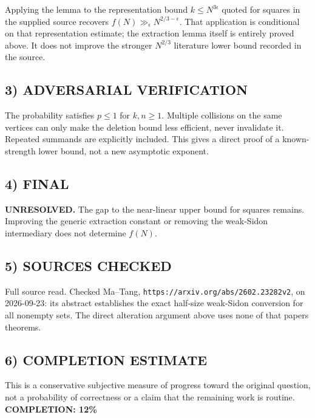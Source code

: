 Applying the lemma to the representation bound $k\le N^{3\epsilon}$ quoted for squares in the supplied source recovers $f(N)\gg_\epsilon N^{2/3-\epsilon}$. That application is conditional on that representation estimate; the extraction lemma itself is entirely proved above. It does not improve the stronger $N^{2/3}$ literature lower bound recorded in the source.
\subsection{3) ADVERSARIAL VERIFICATION}
The probability satisfies $p\le1$ for $k,n\ge1$. Multiple collisions on the same vertices can only make the deletion bound less efficient, never invalidate it. Repeated summands are explicitly included. This gives a direct proof of a known-strength lower bound, not a new asymptotic exponent.
\subsection{4) FINAL}
\textbf{UNRESOLVED.}
The gap to the near-linear upper bound for squares remains. Improving the generic extraction constant or removing the weak-Sidon intermediary does not determine $f(N)$.
\subsection{5) SOURCES CHECKED}
Full source read. Checked Ma--Tang, \texttt{https://arxiv.org/abs/2602.23282v2}, on 2026-09-23: its abstract establishes the exact half-size weak-Sidon conversion for all nonempty sets. The direct alteration argument above uses none of that paper\textquotesingle s theorems.
\subsection{6) COMPLETION ESTIMATE}
This is a conservative subjective measure of progress toward the original question, not a probability of correctness or a claim that the remaining work is routine.
\textbf{COMPLETION: 12\%}
